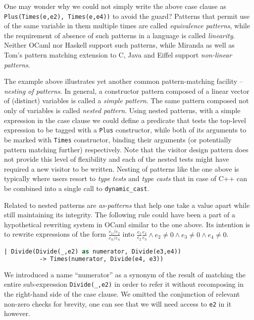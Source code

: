 \documentclass[preprint]{sigplanconf}
\makeatletter
\DeclareRobustCommand{\code}[1]{{\lstinline[breaklines=false,escapechar=@]{#1}}}
\DeclareRobustCommand{\codeocaml}[1]{{\lstinline[breaklines=false,language=Caml]{#1}}}
\makeatother
\begin{document}
One may wonder why we could not simply write the above case clause as 
\codeocaml{Plus(Times(e,e2), Times(e,e4))} to avoid the guard? Patterns that 
permit use of the same variable in them multiple times are called 
\emph{equivalence patterns}, while the requirement of absence of such patterns 
in a language is called \emph{linearity}. Neither OCaml nor Haskell support such 
patterns, while Miranda\cite{Miranda85} as well as Tom's pattern matching 
extension to C, Java and Eiffel\cite{Moreau:2003} support \emph{non-linear 
patterns}.

The example above illustrates yet another common pattern-matching facility -- 
\emph{nesting of patterns}. In general, a constructor pattern composed of a 
linear vector of (distinct) variables is called a \emph{simple pattern}. The 
same pattern composed not only of variables is called \emph{nested pattern}.
Using nested patterns, with a simple expression in the case clause we could
define a predicate that tests the top-level expression to be tagged with a
\codeocaml{Plus} constructor, while both of its arguments to be marked with 
\codeocaml{Times} constructor, binding their arguments (or potentially pattern 
matching further) respectively. Note that the visitor design pattern does not 
provide this level of flexibility and each of the nested tests might have 
required a new visitor to be written. Nesting of patterns like the one above is 
typically where users resort to \emph{type tests} and \emph{type casts} that in 
case of C++ can be combined into a single call to \code{dynamic_cast}.

Related to nested patterns are \emph{as-patterns} that help one take a value 
apart while still maintaining its integrity. The following rule could have been 
a part of a hypothetical rewriting system in OCaml similar to the one above. Its 
intention is to rewrite expressions of the form $\frac{e_1/e_2}{e_3/e_4}$ into 
$\frac{e_1}{e_2}\frac{e_4}{e_3} \wedge e_2\neq0 \wedge e_3\neq0 \wedge e_4\neq0$.

\begin{lstlisting}[language=Caml,keepspaces,columns=flexible]
    | Divide(Divide(_,e2) as numerator, Divide(e3,e4))
          -> Times(numerator, Divide(e4, e3))
\end{lstlisting}

We introduced a name ``numerator'' as a synonym of the result of matching the 
entire sub-expression \codeocaml{Divide(_,e2)} in order to refer it without 
recomposing in the right-hand side of the case clause. We omitted the 
conjunction of relevant non-zero checks for brevity, one can see that we will 
need access to \codeocaml{e2} in it however.
\end{document}
